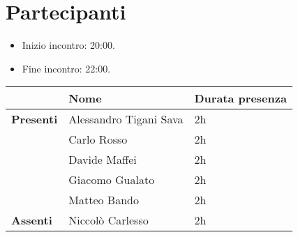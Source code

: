 \section{Partecipanti}

\begin{itemize}
	\item Inizio incontro: 20:00.
	\item Fine incontro: 22:00.
\end{itemize}


\begin{center}
	{\renewcommand{\arraystretch}{1.5}
		\begin{tabular}{lll}
			                  & \textbf{Nome}          & \textbf{Durata presenza} \\
			\hline
			\textbf{Presenti} & Alessandro Tigani Sava & 2h                       \\
			                  & Carlo Rosso            & 2h                       \\
			                  & Davide Maffei          & 2h                       \\
			                  & Giacomo Gualato        & 2h                       \\
			                  & Matteo Bando           & 2h                       \\
			\hline
			\textbf{Assenti}  & Niccolò Carlesso       & 2h                       \\
		\end{tabular}
	}
\end{center}
